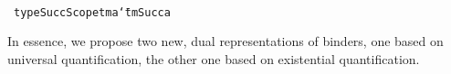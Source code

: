 \documentclass[9pt,preprint,authoryear]{sigplanconf}
\begin{document}
%
%
%
~\\~\vphantom{$\{$}\textcolor[cmyk]{0,0.65,0.99,0}{\texttt{type}}\textcolor[rgb]{0,0,0.80}{\texttt{\mbox{\hspace{0.50em}}}}\textcolor[rgb]{0,0,0.80}{\texttt{SuccScope}}\textcolor[rgb]{0,0,0.80}{\texttt{\mbox{\hspace{0.50em}}}}\textcolor[rgb]{0,0,0.80}{\texttt{tm}}\textcolor[rgb]{0,0,0.80}{\texttt{\mbox{\hspace{0.50em}}}}\textcolor[rgb]{0,0,0.80}{\texttt{a}}\textcolor[rgb]{0,0,0.80}{\texttt{\mbox{\hspace{0.50em}}}}\textcolor[cmyk]{0,0.65,0.99,0}{\texttt{{\char `\=}}}\textcolor[rgb]{0,0,0.80}{\texttt{\mbox{\hspace{0.50em}}}}\textcolor[rgb]{0,0,0.80}{\texttt{tm}}\textcolor[rgb]{0,0,0.80}{\texttt{\mbox{\hspace{0.50em}}}}\textcolor[cmyk]{0,0.65,0.99,0}{\texttt{\makebox[1.22ex][l]{$ {(} $}}}\textcolor[rgb]{0,0,0.80}{\texttt{Succ}}\textcolor[rgb]{0,0,0.80}{\texttt{\mbox{\hspace{0.50em}}}}\textcolor[rgb]{0,0,0.80}{\texttt{a}}\textcolor[cmyk]{0,0.65,0.99,0}{\texttt{\makebox[1.22ex][r]{$ {)} $}}}\textcolor[rgb]{0,0,0.80}{\texttt{{\nopagebreak \newline%
}\vphantom{$\{$}}}%


%
In essence, we propose two new, dual representations of binders,
                                             one based on universal
  quantification, the other one based on existential quantification.%


%
%


{\nopagebreak }
\end{document}
